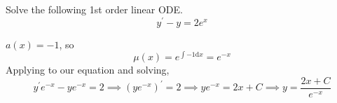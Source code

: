 \begin{example}
	Solve the following 1st order linear ODE.
	\begin{equation*}
		y^\prime - y = 2e^{x}
	\end{equation*}
\end{example}
$a(x) = -1$, so
\begin{equation*}
	\mu(x) = e^{\int{-1 \mathrm{d}x}} = e^{-x}
\end{equation*}
Applying to our equation and solving,
\begin{equation*}
	y^\prime e^{-x} - ye^{-x} = 2 \implies \left(ye^{-x}\right)^\prime = 2 \implies ye^{-x} = 2x + C \implies y = \frac{2x + C}{e^{-x}}
\end{equation*}